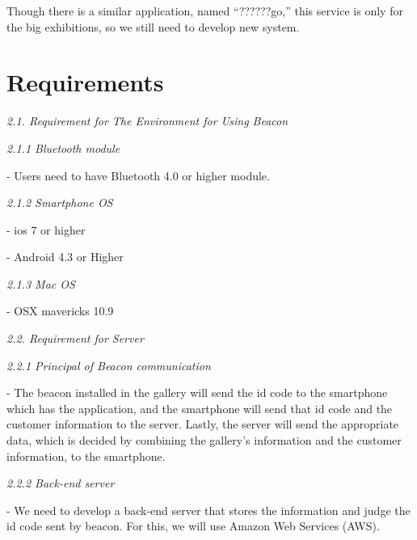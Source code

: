\documentclass{article}
\begin{document}
\noindent Though there is a similar application, named ``??????go,'' this service is only for the big exhibitions, so we still need to develop new system.

\noindent 

\noindent 

\noindent 

\noindent 

\noindent 

\noindent 


\section{ Requirements}

\noindent 

\noindent 

\noindent \textit{2.1. Requirement for The Environment for Using Beacon}

\noindent 

\textit{2.1.1 Bluetooth module}

- Users need to have Bluetooth 4.0 or higher module.



\textit{2.1.2 Smartphone OS}

- ios 7 or higher

- Android 4.3 or Higher



\textit{2.1.3 Mac OS}

- OSX mavericks 10.9

\noindent 

\noindent 

\noindent \textit{2.2. Requirement for Server}

\noindent 

\noindent \textit{2.2.1 Principal of Beacon communication}

\noindent - The beacon installed in the gallery will send the id code to the smartphone which has the application, and the smartphone will send that id code and the customer information to the server. Lastly, the server will send the appropriate data, which is decided by combining the gallery's information and the customer information, to the smartphone.



\noindent \textit{2.2.2 Back-end server }

\noindent - We need to develop a back-end server that stores the information and judge the id code sent by beacon. For this, we will use Amazon Web Services (AWS).
\end{document}
